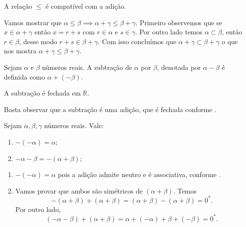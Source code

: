\documentclass[../main.tex]{subfiles}
\begin{document}
\begin{prop}\label{reais-prop-adicaoCompativelOrdem}
    A relação $\leq$ é compatível com a adição.
\end{prop}
\begin{dem}
    Vamos mostrar que $\alpha \leq \beta \implies \alpha + \gamma \leq \beta + \gamma$.
    Primeiro observemos que se $x \in \alpha + \gamma$ então $x = r + s$ com $r \in \alpha$ e $s \in \gamma$. Por outro lado temos $\alpha \subset \beta$, então $r \in \beta$, desse modo $r + s \in \beta + \gamma$. Com isso concluímos que $\alpha + \gamma \subset \beta + \gamma$ o que nos mostra $\alpha + \gamma \leq \beta + \gamma$.
\end{dem}
\begin{defi}
    Sejam $\alpha$ e $\beta$ números reais. A subtração de $\alpha$ por $\beta$, denotada por $\alpha - \beta$ é definida como $\alpha + (-\beta)$.
\end{defi}
\begin{prop}
    A subtração é fechada em $\mathbb{R}$.
\end{prop}
\begin{dem}
    Basta observar que a subtração é uma adição, que é fechada conforme .
\end{dem}

\begin{prop}\label{reais-prop-regraSinais}
    Sejam $\alpha, \beta, \gamma$ números reais. Vale:
    \begin{enumerate}[label=(\roman*)]
        \item $-(-\alpha) = \alpha$;
        \item $-\alpha - \beta = -(\alpha + \beta)$;
    \end{enumerate}
\end{prop}
\begin{dem}
    \begin{enumerate}[label=(\roman*)]
        \item $-(-\alpha) = \alpha$ pois a adição admite neutro e é associativa, conforme . 
        \item Vamos provar que ambos são simétricos de $(\alpha + \beta)$. Temos 
        \[ -(\alpha + \beta) + (\alpha + \beta) = (\alpha + \beta) - (\alpha + \beta) = 0^*. \] Por outro lado, \[ (-\alpha - \beta) + (\alpha + \beta) = \alpha + (- \alpha) + \beta +(- \beta) = 0^*. \]
    \end{enumerate}    
\end{dem}
\end{document}
